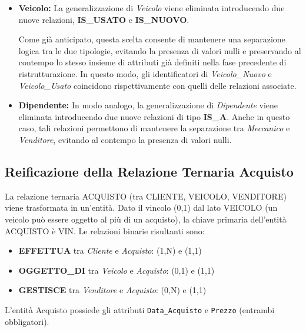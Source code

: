 \begin{itemize}
    \item \textbf{Veicolo:} La generalizzazione di \textit{Veicolo} viene eliminata introducendo due nuove relazioni, \textbf{IS\_USATO} e \textbf{IS\_NUOVO}.

    Come già anticipato, questa scelta consente di mantenere una separazione logica tra le due tipologie, evitando la presenza di valori nulli e preservando al contempo lo stesso insieme di attributi già definiti nella fase precedente di ristrutturazione.
    \newline In questo modo, gli identificatori di \textit{Veicolo\_Nuovo} e \textit{Veicolo\_Usato} coincidono rispettivamente con quelli delle relazioni associate.

    \vspace{0.5cm}

    \item \textbf{Dipendente: } In modo analogo, la generalizzazione di \textit{Dipendente} viene eliminata introducendo due nuove relazioni di tipo \textbf{IS\_A}.
    \newline Anche in questo caso, tali relazioni permettono di mantenere la separazione tra \textit{Meccanico} e \textit{Venditore}, evitando al contempo la presenza di valori nulli.
    
\end{itemize}

\vspace{0.5cm}
\subsection{Reificazione della Relazione Ternaria Acquisto}
La relazione ternaria ACQUISTO (tra CLIENTE, VEICOLO, VENDITORE) viene trasformata in un'entità. Dato il vincolo (0,1) dal lato VEICOLO (un veicolo può essere oggetto al più di un acquisto), la chiave primaria dell'entità ACQUISTO è VIN. Le relazioni binarie risultanti sono:

\begin{itemize}
    \item \textbf{EFFETTUA} tra \textit{Cliente} e \textit{Acquisto}: (1,N) e (1,1)
    \item \textbf{OGGETTO\_DI} tra \textit{Veicolo} e \textit{Acquisto}: (0,1) e (1,1)
    \item \textbf{GESTISCE} tra \textit{Venditore} e \textit{Acquisto}: (0,N) e (1,1)
\end{itemize}
L'entità Acquisto possiede gli attributi \texttt{Data\_Acquisto} e \texttt{Prezzo} (entrambi obbligatori).

